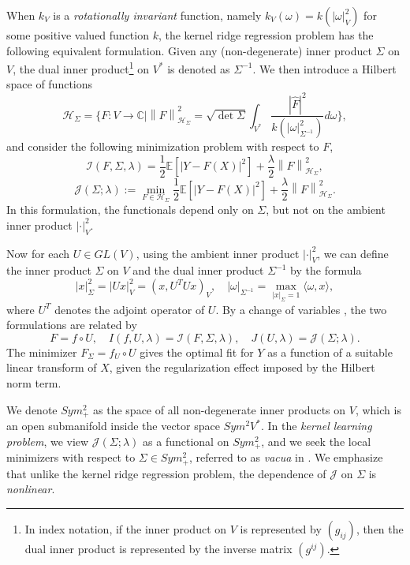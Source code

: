 \documentclass[a4paper]{article}
\theoremstyle{definition}
\newcommand{\C}{\mathbb{C}}
\newcommand{\norm}[1]{\left\lVert#1\right\rVert}
\newcommand{\E}{\mathbb{E}}
\newcommand{\1}{\mathbbm{1}}
\begin{document}
	When $k_V$ is a \emph{rotationally invariant} function, namely $k_V(\omega)= k(|\omega|_V^2)$ for some positive valued function $k$, the kernel ridge regression problem has the following equivalent formulation. Given any (non-degenerate) inner product $\Sigma$ on $V$, the dual inner product\footnote{In index notation, if the inner product on $V$ is represented by $(g_{ij})$, then the dual inner product is represented by the inverse matrix $(g^{ij})$.} on $V^*$ is denoted as $\Sigma^{-1}$. We then introduce a Hilbert space of functions 
	\[
	\mathcal{H}_\Sigma= \{  F: V\to \C|   \norm{F}_{\mathcal{H}_\Sigma}^2
	=\sqrt{\det\Sigma}\int_{V^*} \frac{|\hat{F}|^2}{ k(|\omega|_{\Sigma^{-1}}^2) } d\omega \},
	\]
	and consider the following minimization problem with respect to $F$,
	\begin{equation}\label{eqn:functionalI2}
		\mathcal{I}(F, \Sigma, \lambda)=  \frac{1}{2} \E[|Y-F(X)|^2] + \frac{\lambda}{2} \norm{F}_{\mathcal{H}_\Sigma}^2,
	\end{equation}
	\[
	\mathcal{J}(\Sigma; \lambda):=\min_{F\in \mathcal{H}_\Sigma }  \frac{1}{2} \E[|Y-F(X)|^2] + \frac{\lambda}{2} \norm{F}_{\mathcal{H}_\Sigma}^2. 
	\]
	In this formulation, the functionals depend only on $\Sigma$, but not on the ambient inner product $|\cdot|_V^2$. 
	
	
	
	
	Now for each $U\in GL(V)$, using the ambient inner product $|\cdot|_V^2$, we can define the inner product $\Sigma$ on $V$ and the dual inner product $\Sigma^{-1}$ by the formula
	\[
	|x|_\Sigma^2= |Ux|^2_V=(x, U^TUx)_V, \quad |\omega|_{\Sigma^{-1}}= \max_{|x|_\Sigma=1} \langle \omega, x\rangle,
	\]
	where $U^T$ denotes the adjoint operator of $U$.
	By a change of variables \cite[Lemma 4.1]{RuanLi}, the two formulations are related by
	\begin{equation}\label{eqn:twominimizationproblems}
		F= f\circ U,\quad   I(f, U, \lambda)= \mathcal{I}(F, \Sigma, \lambda),\quad J(U,\lambda)= \mathcal{J}(\Sigma; \lambda). 
	\end{equation}
	The minimizer $F_\Sigma=f_U\circ U$ gives the optimal fit for $Y$ as a function of a suitable linear transform of $X$, given the regularization effect imposed by the Hilbert norm term.
	
	
	
	
	We denote $Sym^2_+$ as the space of all non-degenerate inner products on $V$, which is an open submanifold inside the vector space $Sym^2 V^*$. In the \emph{kernel learning problem}, we view $\mathcal{J}(\Sigma;\lambda)$ as a functional on $Sym^2_+$, and we seek the local minimizers with respect to $\Sigma\in Sym^2_+$, referred to as \emph{vacua} in \cite{RuanLi}. We emphasize that unlike the kernel ridge regression problem, the dependence of $\mathcal{J}$ on $\Sigma$ is \emph{nonlinear}.
	
\end{document}
